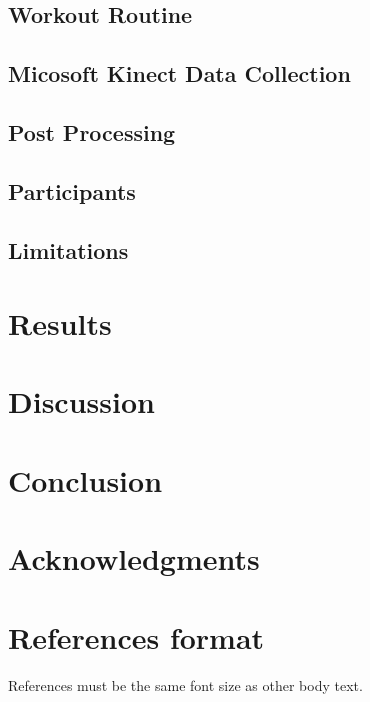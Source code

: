 \documentclass{sigchi}
\begin{document}
\subsection{Workout Routine}


\subsection{Micosoft Kinect Data Collection}


\subsection{Post Processing}


\subsection{Participants}


\subsection{Limitations}


\section{Results}


\section{Discussion}


\section{Conclusion}


\section{Acknowledgments}


\section{References format}
References must be the same font size as other body text.



\end{document}

